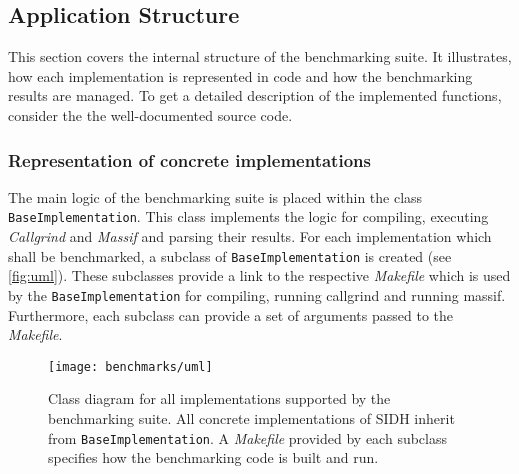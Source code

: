 \subsection{Application Structure}\label{sec:app_structure}

This section covers the internal structure of the benchmarking suite. It illustrates, how each implementation is represented in code and how the benchmarking results are managed. To get a detailed description of the implemented functions, consider the the well-documented source code.

\subsubsection{Representation of concrete implementations}

The main logic of the benchmarking suite is placed within the class \texttt{BaseImplementation}. This class implements the logic for compiling, executing \textit{Callgrind} and \textit{Massif} and parsing their results. For each implementation which shall be benchmarked, a subclass of \texttt{BaseImplementation} is created (see \autoref{fig:uml}). These subclasses provide a link to the respective \textit{Makefile} which is used by the \texttt{BaseImplementation} for compiling, running callgrind and running massif. Furthermore, each subclass can provide a set of arguments passed to the \textit{Makefile}.\\

\begin{figure}[H]
  \centering
  \texttt{[image: benchmarks/uml]}
  \caption[Class diagram for supported implementations]
  {Class diagram for all implementations supported by the benchmarking suite. All concrete implementations of SIDH inherit from \texttt{BaseImplementation}. A \textit{Makefile} provided by each subclass specifies how the benchmarking code is built and run.} \label{fig:uml}
\end{figure}

